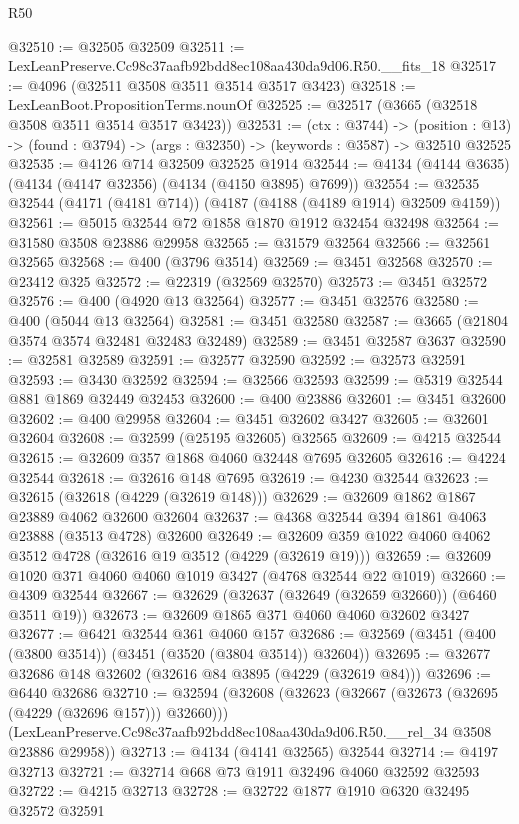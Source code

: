 \begin{lexlean}{R50}
\begin{coremodule}
@32510 := @32505 @32509
@32511 := LexLeanPreserve.Cc98c37aafb92bdd8ec108aa430da9d06.R50.__fits_18
@32517 := @4096 (@32511 @3508 @3511 @3514 @3517 @3423)
@32518 := LexLeanBoot.PropositionTerms.nounOf
@32525 := @32517 (@3665 (@32518 @3508 @3511 @3514 @3517 @3423))
@32531 := (ctx : @3744) ->
  (position : @13) -> (found : @3794) -> (args : @32350) -> (keywords : @3587) -> @32510 @32525
@32535 := @4126 @714 @32509 @32525 @1914
@32544 := @4134 (@4144 @3635) (@4134 (@4147 @32356) (@4134 (@4150 @3895) @7699))
@32554 := @32535 @32544 (@4171 (@4181 @714)) (@4187 (@4188 (@4189 @1914) @32509 @4159))
@32561 := @5015 @32544 @72 @1858 @1870 @1912 @32454 @32498
@32564 := @31580 @3508 @23886 @29958
@32565 := @31579 @32564
@32566 := @32561 @32565
@32568 := @400 (@3796 @3514)
@32569 := @3451 @32568
@32570 := @23412 @325
@32572 := @22319 (@32569 @32570)
@32573 := @3451 @32572
@32576 := @400 (@4920 @13 @32564)
@32577 := @3451 @32576
@32580 := @400 (@5044 @13 @32564)
@32581 := @3451 @32580
@32587 := @3665 (@21804 @3574 @3574 @32481 @32483 @32489)
@32589 := @3451 @32587 @3637
@32590 := @32581 @32589
@32591 := @32577 @32590
@32592 := @32573 @32591
@32593 := @3430 @32592
@32594 := @32566 @32593
@32599 := @5319 @32544 @881 @1869 @32449 @32453
@32600 := @400 @23886
@32601 := @3451 @32600
@32602 := @400 @29958
@32604 := @3451 @32602 @3427
@32605 := @32601 @32604
@32608 := @32599 (@25195 @32605) @32565
@32609 := @4215 @32544
@32615 := @32609 @357 @1868 @4060 @32448 @7695 @32605
@32616 := @4224 @32544
@32618 := @32616 @148 @7695
@32619 := @4230 @32544
@32623 := @32615 (@32618 (@4229 (@32619 @148)))
@32629 := @32609 @1862 @1867 @23889 @4062 @32600 @32604
@32637 := @4368 @32544 @394 @1861 @4063 @23888 (@3513 @4728) @32600
@32649 := @32609 @359 @1022 @4060 @4062 @3512 @4728 (@32616 @19 @3512 (@4229 (@32619 @19)))
@32659 := @32609 @1020 @371 @4060 @4060 @1019 @3427 (@4768 @32544 @22 @1019)
@32660 := @4309 @32544
@32667 := @32629 (@32637 (@32649 (@32659 @32660)) (@6460 @3511 @19))
@32673 := @32609 @1865 @371 @4060 @4060 @32602 @3427
@32677 := @6421 @32544 @361 @4060 @157
@32686 := @32569 (@3451 (@400 (@3800 @3514)) (@3451 (@3520 (@3804 @3514)) @32604))
@32695 := @32677 @32686 @148 @32602 (@32616 @84 @3895 (@4229 (@32619 @84)))
@32696 := @6440 @32686
@32710 := @32594
    (@32608
      (@32623 (@32667 (@32673 (@32695 (@4229 (@32696 @157))) @32660)))
      (LexLeanPreserve.Cc98c37aafb92bdd8ec108aa430da9d06.R50.__rel_34 @3508 @23886 @29958))
@32713 := @4134 (@4141 @32565) @32544
@32714 := @4197 @32713
@32721 := @32714 @668 @73 @1911 @32496 @4060 @32592 @32593
@32722 := @4215 @32713
@32728 := @32722 @1877 @1910 @6320 @32495 @32572 @32591

\end{coremodule}
\end{lexlean}
